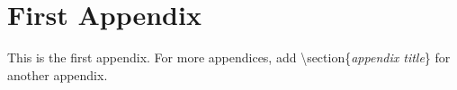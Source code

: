 \appendix
\section{First Appendix}
This is the first appendix. For more appendices, add \textbackslash section\{\textit{appendix title}\} for another appendix. 
